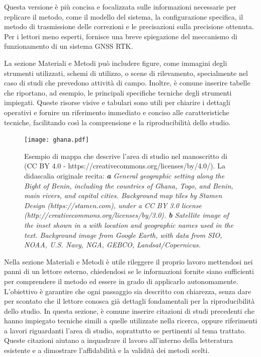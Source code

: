 \documentclass[9pt,a4paper,twoside]{rho-class/rho}
\begin{document}
\begin{info}
Questa versione è più concisa e focalizzata sulle informazioni necessarie per replicare il metodo, come il modello del sistema, la configurazione specifica, il metodo di trasmissione delle correzioni e le precisazioni sulla precisione ottenuta. Per i lettori meno esperti, fornisce una breve spiegazione del meccanismo di funzionamento di un sistema GNSS RTK.
\end{info}

La sezione Materiali e Metodi può includere figure, come immagini degli strumenti utilizzati, schemi di utilizzo, o scene di rilevamento, specialmente nel caso di studi che prevedono attività di campo. Inoltre, è comune inserire tabelle che riportano, ad esempio, le principali specifiche tecniche degli strumenti impiegati. Queste risorse visive e tabulari sono utili per chiarire i dettagli operativi e fornire un riferimento immediato e conciso alle caratteristiche tecniche, facilitando così la comprensione e la riproducibilità dello studio. 

\begin{figure}[!ht]
    \centering
    \texttt{[image: ghana.pdf]}
    \caption{Esempio di mappa che descrive l'area di studio nel manoscritto di \cite{mann_multi-decadal_2023} (CC BY 4.0 - https://creativecommons.org/licenses/by/4.0/). La didascalia originale recita: \textit{\textbf{a} General geographic setting along the Bight of Benin, including the countries of Ghana, Togo, and Benin, main rivers, and capital cities. Background map tiles by Stamen Design (https://stamen.com), under a CC BY 3.0 license (http://creativecommons.org/licenses/by/3.0). \textbf{b} Satellite image of the inset shown in a with location and geographic names used in the text. Background image from Google Earth, with data from SIO, NOAA, U.S. Navy, NGA, GEBCO, Landsat/Copernicus.}}
    \label{fig:map_example}
\end{figure}

Nella sezione Materiali e Metodi è utile rileggere il proprio lavoro mettendosi nei panni di un lettore esterno, chiedendosi se le informazioni fornite siano sufficienti per comprendere il metodo ed essere in grado di applicarlo autonomamente. L’obiettivo è garantire che ogni passaggio sia descritto con chiarezza, senza dare per scontato che il lettore conosca già dettagli fondamentali per la riproducibilità dello studio. In questa sezione, è comune inserire citazioni di studi precedenti che hanno impiegato tecniche simili a quelle utilizzate nella ricerca, oppure riferimenti a lavori riguardanti l’area di studio, soprattutto se pertinenti al tema trattato. Queste citazioni aiutano a inquadrare il lavoro all’interno della letteratura esistente e a dimostrare l’affidabilità e la validità dei metodi scelti.
\end{document}
